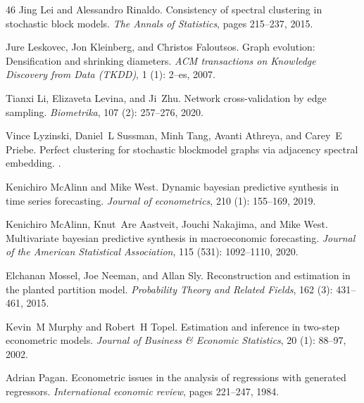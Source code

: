 \documentclass[12pt]{article}
\newcommand{\1}{\mathbf{1}}
\begin{document}
\begin{thebibliography}{46}
Jing Lei and Alessandro Rinaldo.
\newblock Consistency of spectral clustering in stochastic block models.
\newblock \emph{The Annals of Statistics}, pages 215--237, 2015.

Jure Leskovec, Jon Kleinberg, and Christos Faloutsos.
\newblock Graph evolution: Densification and shrinking diameters.
\newblock \emph{ACM transactions on Knowledge Discovery from Data (TKDD)},
  1 (1): 2--es, 2007.

Tianxi Li, Elizaveta Levina, and Ji~Zhu.
\newblock Network cross-validation by edge sampling.
\newblock \emph{Biometrika}, 107 (2): 257--276, 2020.

Vince Lyzinski, Daniel~L Sussman, Minh Tang, Avanti Athreya, and Carey~E
  Priebe.
\newblock Perfect clustering for stochastic blockmodel graphs via adjacency
  spectral embedding.
.

Kenichiro McAlinn and Mike West.
\newblock Dynamic bayesian predictive synthesis in time series forecasting.
\newblock \emph{Journal of econometrics}, 210 (1): 155--169,
  2019.

Kenichiro McAlinn, Knut~Are Aastveit, Jouchi Nakajima, and Mike West.
\newblock Multivariate bayesian predictive synthesis in macroeconomic
  forecasting.
\newblock \emph{Journal of the American Statistical Association}, 115
  (531): 1092--1110, 2020.

Elchanan Mossel, Joe Neeman, and Allan Sly.
\newblock Reconstruction and estimation in the planted partition model.
\newblock \emph{Probability Theory and Related Fields}, 162
  (3): 431--461, 2015.

Kevin~M Murphy and Robert~H Topel.
\newblock Estimation and inference in two-step econometric models.
\newblock \emph{Journal of Business \& Economic Statistics}, 20
  (1): 88--97, 2002.

Adrian Pagan.
\newblock Econometric issues in the analysis of regressions with generated
  regressors.
\newblock \emph{International economic review}, pages 221--247, 1984.


\end{thebibliography}
\end{document}
